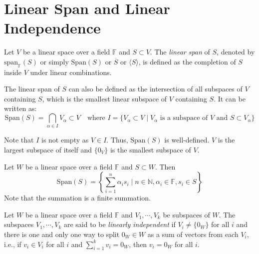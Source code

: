 \documentclass[
	11pt, %
	fleqn, %
	a4paper, %
]{LegrandOrangeBook}
\renewcommand{\span}[1]{\text{Span}(#1)} %
\renewcommand{\bar}[1]{\overline{#1}} %
\newcommand{\F}{\mathbb{F}} %
\begin{document}
\newpage

\section{Linear Span and Linear Independence}

\begin{definition}
    Let $V$ be a linear space over a field $\F$ and $S \subset V$. The \emph{linear span} of $S$, denoted by $\text{span}_\F (S)$ or simply $\span S$ or $\bar{S}$ or $\langle S \rangle$, is defined as the completion of $S$ inside $V$ under linear combinations.
\end{definition}

\begin{corollary}
    The linear span of $S$ can also be defined as the intersection of all subspaces of $V$ containing $S$, which is the smallest linear subspace of $V$ containing $S$. It can be written as:
    \[
        \span S = \bigcap_{\alpha \in I} V_{\alpha} \subset V \quad \text{where } I = \{ V_{\alpha} \subset V \mid V_{\alpha} \text{ is a subspace of } V \text{ and } S \subset V_{\alpha} \}
    \]
\end{corollary}

\begin{remark}
    Note that $I$ is not empty as $V \in I$. Thus, $\span S$ is well-defined. $V$ is the largest subspace of itself and $\{0_V\}$ is the smallest subspace of $V$.
\end{remark}

\begin{proposition}
    Let $W$ be a linear space over a field $\F$ and $S \subset W$. Then 
    \[
        \span S = \left\{ \sum_{i=1}^{n} \alpha_i s_i \mid n \in \mathbb{N}, \alpha_i \in \F, s_i \in S \right\}
    \]
    Note that the summation is a finite summation.
\end{proposition}

\begin{definition} \label{def:linear_independence}
    Let $W$ be a linear space over a field $\F$ and $V_1, \cdots, V_k$ be subspaces of $W$. The subspaces $V_1, \cdots, V_k$ are said to be \emph{linearly independent} if $V_i \neq \{0_W\}$ for all $i$ and there is one and only one way to split $0_W \in W$ as a sum of vectors from each $V_i$, i.e., if $v_i \in V_i$ for all $i$ and $\sum_{i=1}^{k} v_i = 0_W$, then $v_i = 0_W$ for all $i$.
\end{definition}
\end{document}
